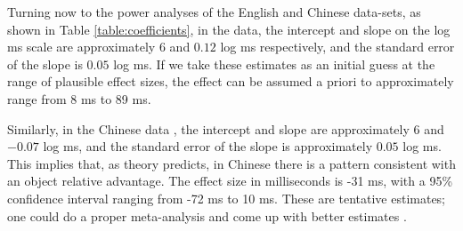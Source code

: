\documentclass{ar-1col}\usepackage[]{graphicx}\usepackage[]{color}
\begin{document}
Turning now to the power analyses of the English and Chinese data-sets, as shown in Table \ref{table:coefficients}, 
in the \citet{grodner} data,  the intercept and slope on the log ms scale are approximately $6$ and $0.12$ log ms respectively, and the standard error of the slope is $0.05$ log ms. If we take these estimates as an initial guess at the range of plausible effect sizes, the effect can be assumed a priori to approximately range from 8 ms to 89 ms.
\begin{marginnote}[]
\end{marginnote}

Similarly, in the Chinese data \citep{gibsonwu}, the intercept and slope are approximately $6$ and $-0.07$ log ms, and the standard error of the slope is approximately $0.05$ log ms. This implies that, as theory predicts, in Chinese there is a pattern consistent with an object relative advantage. The effect size in milliseconds is  -31 ms, with a 95\% confidence interval ranging from 
-72 ms to 10 ms.
These are tentative estimates; one could do a proper meta-analysis and come up with better estimates \citep[e.g.,][]{VasishthetalPLoSOne2013}. 
\end{document}

